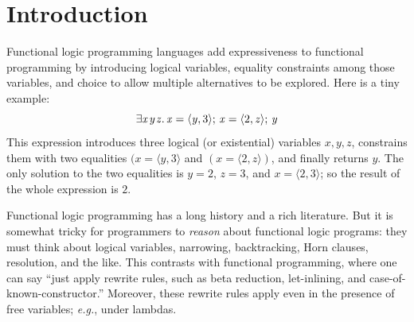 \documentclass[acmsmall,review,dvipsnames]{acmart}
\newcommand{\Varid}[1]{\mathit{#1}}
\newcommand{\eg}{\emph{e.g.}}
\begin{document}
\maketitle


\section{Introduction}

Functional logic programming languages add expressiveness to functional programming
by introducing logical variables, equality constraints among those variables,
and choice to allow multiple alternatives to be explored.  Here is a tiny example:
$$
\ensuremath{\exists\Varid{x}\hspace{0.3mm}\Varid{y}\hspace{0.3mm}\Varid{z}.\,\Varid{x}\mathrel{=}\langle{}\Varid{y},\mathrm{3}\rangle;\,\Varid{x}\mathrel{=}\langle{}\mathrm{2},\Varid{z}\rangle;\,\Varid{y}}
$$
This expression introduces three logical (or existential) variables \ensuremath{\Varid{x},\Varid{y},\Varid{z}},
constrains them with two equalities \ensuremath{(\Varid{x}\mathrel{=}\langle{}\Varid{y},\mathrm{3}\rangle} and \ensuremath{(\Varid{x}\mathrel{=}\langle{}\mathrm{2},\Varid{z}\rangle)}, and finally returns \ensuremath{\Varid{y}}.
The only solution to the two equalities is \ensuremath{\Varid{y}\mathrel{=}\mathrm{2}}, \ensuremath{\Varid{z}\mathrel{=}\mathrm{3}}, and \ensuremath{\Varid{x}\mathrel{=}\langle{}\mathrm{2},\mathrm{3}\rangle}; so the result of the
whole expression is \ensuremath{\mathrm{2}}.

Functional logic programming has a long history and a rich literature.
But it is somewhat tricky for programmers to \emph{reason} about
functional logic programs: they must think about logical variables,
narrowing, backtracking, Horn clauses, resolution, and the like.  This
contrasts with functional programming, where one can say ``just apply
rewrite rules, such as beta reduction, let-inlining, and
case-of-known-constructor.''  Moreover, these rewrite rules apply even
in the presence of free variables; {\eg}, under lambdas.
\end{document}

